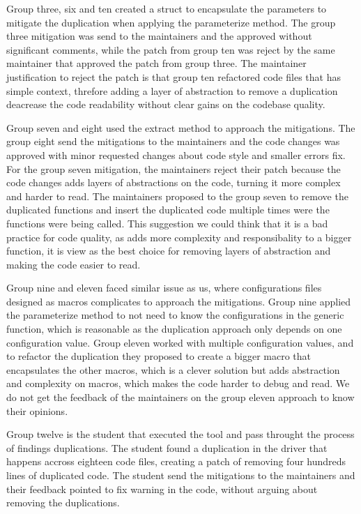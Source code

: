 Group three, six and ten created a struct to encapsulate the parameters to mitigate the duplication when 
applying the parameterize method. The group three mitigation was send to the maintainers and the approved 
without significant comments, while the patch from group ten was reject by the same maintainer that approved
the patch from group three. The maintainer justification to reject the patch is that group ten refactored 
code files that has simple context, threfore adding a layer of abstraction to remove a duplication 
deacrease the code readability without clear gains on the codebase quality.

Group seven and eight used the extract method to approach the mitigations. The group eight send the 
mitigations to the maintainers and the code changes was approved with minor requested changes
about code style and smaller errors fix. For the group seven mitigation, the maintainers reject 
their patch because the code changes adds layers of abstractions on the code, turning it more complex
and harder to read. The maintainers proposed to the group seven to remove the duplicated functions 
and insert the duplicated code multiple times were the functions were being called. 
This suggestion we could think that it is a bad practice for code quality, as adds more complexity and 
responsibality to a bigger function, it is view as the best choice for removing layers of abstraction 
and making the code easier to read.

Group nine and eleven faced similar issue as us, where configurations files
designed as macros complicates to approach the mitigations. Group nine applied the parameterize method
to not need to know the configurations in the generic function, which is reasonable as the duplication
approach only depends on one configuration value. Group eleven worked with multiple configuration values,
and to refactor the duplication they proposed to create a bigger macro that encapsulates the other macros,
which is a clever solution but adds abstraction and complexity on macros, which makes the code harder
to debug and read. We do not get the feedback of the maintainers on the group eleven approach to know their 
opinions.

Group twelve is the student that executed the tool and pass throught the process of findings duplications.
The student found a duplication in the driver that happens accross eighteen code files, creating a patch
of removing four hundreds lines of duplicated code. 
The student send the mitigations to the maintainers and their feedback pointed to fix warning in the code, 
without arguing about removing the duplications.

